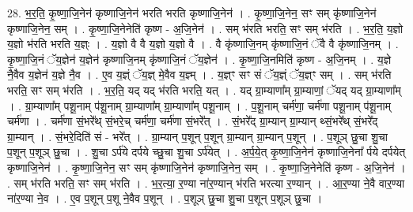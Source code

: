 \documentclass[17pt]{extarticle}
\begin{document}
28. भ॒र॒ति॒ कृ॒ष्णा॒जि॒नेन॑ कृष्णाजि॒नेन॑ भरति भरति कृष्णाजि॒नेन॑ । . कृ॒ष्णा॒जि॒नेन॒ सꣳ सम् कृ॑ष्णाजि॒नेन॑ कृष्णाजि॒नेन॒ सम् । . कृ॒ष्णा॒जि॒नेनेति॑ कृष्ण - अ॒जि॒नेन॑ । . सम् भ॑रति भरति॒ सꣳ सम् भ॑रति । . भ॒र॒ति॒ य॒ज्ञो य॒ज्ञो भ॑रति भरति य॒ज्ञ्ः । . य॒ज्ञो वै वै य॒ज्ञो य॒ज्ञो वै । . वै कृ॑ष्णाजि॒नम् कृ॑ष्णाजि॒नं ॅवै वै कृ॑ष्णाजि॒नम् । . कृ॒ष्णा॒जि॒नं ॅय॒ज्ञेन॑ य॒ज्ञेन॑ कृष्णाजि॒नम् कृ॑ष्णाजि॒नं ॅय॒ज्ञेन॑ । . कृ॒ष्णा॒जि॒नमिति॑ कृष्ण - अ॒जि॒नम् । . य॒ज्ञे नै॒वैव य॒ज्ञेन॑ य॒ज्ञे नै॒व । . ए॒व य॒ज्ञ्ं ॅय॒ज्ञ् मे॒वैव य॒ज्ञ्म् । . य॒ज्ञ्ꣳ सꣳ सं ॅय॒ज्ञ्ं ॅय॒ज्ञ्ꣳ सम् । . सम् भ॑रति भरति॒ सꣳ सम् भ॑रति । . भ॒र॒ति॒ यद् यद् भ॑रति भरति॒ यत् । . यद् ग्रा॒म्याणा᳚म् ग्रा॒म्याणां॒ ॅयद् यद् ग्रा॒म्याणा᳚म् । . ग्रा॒म्याणा᳚म् पशू॒नाम् प॑शू॒नाम् ग्रा॒म्याणा᳚म् ग्रा॒म्याणा᳚म् पशू॒नाम् । . प॒शू॒नाम् चर्म॑णा॒ चर्म॑णा पशू॒नाम् प॑शू॒नाम् चर्म॑णा । . चर्म॑णा सं॒भरे᳚थ् सं॒भरे॒च् चर्म॑णा॒ चर्म॑णा सं॒भरे᳚त् । . सं॒भरे᳚द् ग्रा॒म्यान् ग्रा॒म्यान् थ्सं॒भरे᳚थ् सं॒भरे᳚द् ग्रा॒म्यान् । . सं॒भरे॒दिति॑ सं - भरे᳚त् । . ग्रा॒म्यान् प॒शून् प॒शून् ग्रा॒म्यान् ग्रा॒म्यान् प॒शून् । . प॒शूञ् छु॒चा शु॒चा प॒शून् प॒शूञ् छु॒चा । . शु॒चा ऽर्प॑ये दर्पये च्छु॒चा शु॒चा ऽर्प॑येत् । . अ॒र्प॒ये॒त् कृ॒ष्णा॒जि॒नेन॑ कृष्णाजि॒नेना᳚ र्पये दर्पयेत् कृष्णाजि॒नेन॑ । . कृ॒ष्णा॒जि॒नेन॒ सꣳ सम् कृ॑ष्णाजि॒नेन॑ कृष्णाजि॒नेन॒ सम् । . कृ॒ष्णा॒जि॒नेनेति॑ कृष्ण - अ॒जि॒नेन॑ । . सम् भ॑रति भरति॒ सꣳ सम् भ॑रति । . भ॒र॒त्या॒ र॒ण्या ना॑र॒ण्यान् भ॑रति भरत्या र॒ण्यान् । . आ॒र॒ण्या ने॒वै वार॒ण्या ना॑र॒ण्या ने॒व । . ए॒व प॒शून् प॒शू ने॒वैव प॒शून् । . प॒शूञ् छु॒चा शु॒चा प॒शून् प॒शूञ् छु॒चा । \newline
\end{document}
